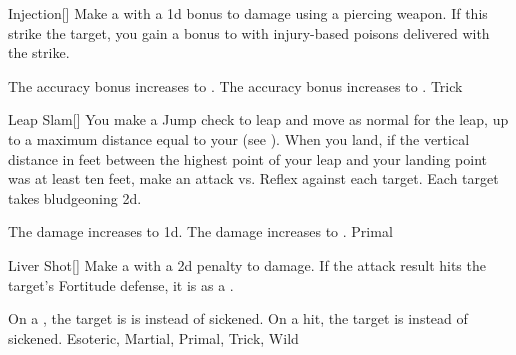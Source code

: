 \lowercase{\hypertarget{maneuver:Injection}{}}\label{maneuver:Injection}
\hypertarget{maneuver:Injection}{}
\begin{freeability}[Rank 3]{Injection}[]
Make a  with a \plus1d bonus to damage using a piercing weapon.
If this strike  the target, you gain a  bonus to  with injury-based poisons delivered with the strike.

\rankline
{} The accuracy bonus increases to .
 The accuracy bonus increases to .
 Trick
\end{freeability}
\vspace{0.25em}



\lowercase{\hypertarget{maneuver:Leap Slam}{}}\label{maneuver:Leap Slam}
\hypertarget{maneuver:Leap Slam}{}
\begin{freeability}[Rank 3]{Leap Slam}[]
You make a Jump check to leap and move as normal for the leap, up to a maximum distance equal to your  (see ).
When you land, if the vertical distance in feet between the highest point of your leap and your landing point was at least ten feet, make an attack vs. Reflex against each target.
\hit Each target takes bludgeoning  \minus2d.

\rankline
{} The damage increases to  \minus1d.
 The damage increases to .
 Primal
\end{freeability}
\vspace{0.25em}



\lowercase{\hypertarget{maneuver:Liver Shot}{}}\label{maneuver:Liver Shot}
\hypertarget{maneuver:Liver Shot}{}
\begin{freeability}[Rank 3]{Liver Shot}[]
Make a  with a \minus2d penalty to damage.
If the attack result hits the target's Fortitude defense,
it is  as a .

\rankline
{} On a , the target is is  instead of sickened.
 On a hit, the target is  instead of sickened.
 Esoteric, Martial, Primal, Trick, Wild
\end{freeability}
\vspace{0.25em}



